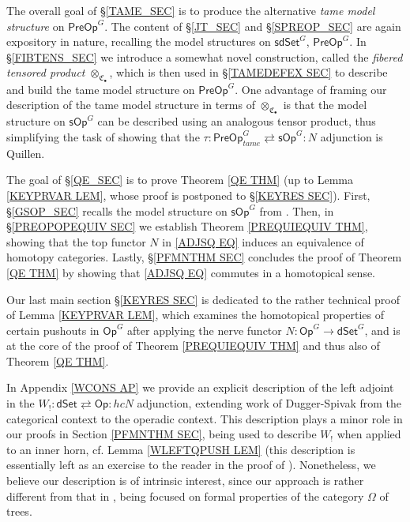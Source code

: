 \documentclass[a4paper,10pt]{article}%
\numberwithin{equation}{section}
\numberwithin{figure}{section}
\theoremstyle{definition} %
\newcommand{\1}{\ensuremath{\mathbbm 1}}%
\begin{document}
The overall goal of \S \ref{TAME_SEC}
is to produce the alternative \emph{tame model structure}
on $\mathsf{PreOp}^G$.
The content of \S \ref{JT_SEC} and \S \ref{SPREOP_SEC}
are again expository in nature, 
recalling the model structures on 
$\mathsf{sdSet}^G$, 
$\mathsf{PreOp}^G$.
In \S \ref{FIBTENS_SEC}
we introduce a somewhat novel construction,
called the \emph{fibered tensored product}
$\otimes_{\mathfrak{C}_{\bullet}}$,
which is then used in 
\S \ref{TAMEDEFEX SEC}
to describe and build the tame model structure on 
$\mathsf{PreOp}^G$.
One advantage of framing our description 
of the tame model structure
in terms of $\otimes_{\mathfrak{C}_{\bullet}}$
is that the model structure
on $\mathsf{sOp}^G$
can be described using an analogous tensor product,
thus simplifying the task of showing that the 
$\tau \colon \mathsf{PreOp}^G_{tame}
\rightleftarrows
\mathsf{sOp}^G \colon N$
adjunction is Quillen.


The goal of \S \ref{QE_SEC} is to prove 
Theorem \ref{QE THM}
(up to Lemma \ref{KEYPRVAR LEM},
whose proof is postponed to \S \ref{KEYRES SEC}).
First,
\S \ref{GSOP_SEC} recalls the model structure on
$\mathsf{sOp}^G$ from \cite{BP_HGOP}.
Then, in 
\S \ref{PREOPOPEQUIV SEC}
we establish Theorem \ref{PREQUIEQUIV THM},
showing that the top functor $N$ in 
\eqref{ADJSQ EQ}
induces an equivalence of homotopy categories.
Lastly, \S \ref{PFMNTHM SEC}
concludes the proof of Theorem \ref{QE THM}
by showing that
\eqref{ADJSQ EQ}
commutes in a homotopical sense.


Our last main section \S \ref{KEYRES SEC}
is dedicated to the rather technical proof of 
Lemma \ref{KEYPRVAR LEM},
which examines the homotopical properties
of certain pushouts in 
$\mathsf{Op}^G$
after applying the nerve functor
$N \colon \mathsf{Op}^G \to \mathsf{dSet}^G$,
and is at the core of the proof of 
Theorem \ref{PREQUIEQUIV THM}
and thus also of Theorem \ref{QE THM}.


In Appendix \ref{WCONS AP}
we provide an explicit description of the left adjoint
in the 
$W_! 
\colon 
\mathsf{dSet} 
\rightleftarrows 
\mathsf{Op}
\colon 
hcN$
adjunction,
extending work of Dugger-Spivak \cite{DS11}
from the categorical context to the operadic context.
This description plays a minor role in our proofs 
in Section \ref{PFMNTHM SEC},
being used to describe
$W_!$ when applied to an inner horn,
cf. Lemma \ref{WLEFTQPUSH LEM}
(this description is essentially left as an exercise to the reader in the proof of \cite[Prop. 4.5]{CM13b}).
Nonetheless, we believe our description is of intrinsic interest,
since our approach is rather different from that in \cite{DS11},
being focused on formal properties of the category
$\Omega$ of trees.
\end{document}

